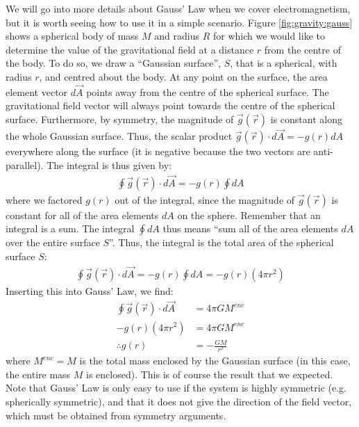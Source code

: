 We will go into more details about Gauss' Law when we cover electromagnetism, but it is worth seeing how to use it in a simple scenario. Figure \ref{fig:gravity:gauss} shows a spherical body of mass $M$ and radius $R$ for which we would like to determine the value of the gravitational field at a distance $r$ from the centre of the body.
To do so, we draw a ``Gaussian surface'', $S$, that is a spherical, with radius $r$, and centred about the body. At any point on the surface, the area element vector $d\vec A$ points away from the centre of the spherical surface. The gravitational field vector will always point towards the centre of the spherical surface. Furthermore, by symmetry, the magnitude of $\vec g(\vec r)$ is constant along the whole Gaussian surface. Thus, the scalar product $\vec g(\vec r) \cdot d\vec A=-g(r)dA$ everywhere along the surface (it is negative because the two vectors are anti-parallel). The integral is thus given by:
\begin{align*}
\oint \vec g(\vec r) \cdot d\vec A = -g(r)\oint dA 
\end{align*}
where we factored $g(r)$ out of the integral, since the magnitude of $\vec g(\vec r)$ is constant for all of the area elements $dA$ on the sphere. Remember that an integral is a sum. The integral $\oint dA$ thus means ``sum all of the area elements $dA$ over the entire surface $S$''. Thus, the integral is the total area of the spherical surface $S$:
\begin{align*}
\oint \vec g(\vec r) \cdot d\vec A = -g(r)\oint dA =-g(r)(4\pi r^2)
\end{align*}
Inserting this into Gauss' Law, we find:
\begin{align*}
\oint \vec g(\vec r) \cdot d\vec A &= 4\pi G M^{enc}\\
-g(r)(4\pi r^2) &= 4\pi G M^{enc}\\
\therefore g(r) &= - \frac{GM}{r^2}
\end{align*}
where $M^{enc}=M$ is the total mass enclosed by the Gaussian surface (in this case, the entire mass $M$ is enclosed). This is of course the result that we expected. Note that Gauss' Law is only easy to use if the system is highly symmetric (e.g. spherically symmetric), and that it does not give the direction of the field vector, which must be obtained from symmetry arguments. 

